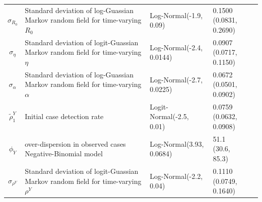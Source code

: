 \begin{table}
\begin{tabularx}{\columnwidth}{cXllc}
$\sigma_{R_0}$ & Standard deviation of log-Guassian Markov random field for time-varying $R_0$ & Log-Normal(-1.9, 0.09) & \makecell{0.1500 \\ (0.0831, 0.2690)} & \\
$\sigma_\eta$ & Standard deviation of logit-Guassian Markov random field for time-varying $\eta$ & Log-Normal(-2.4, 0.0144) & \makecell{0.0907 \\ (0.0717, 0.1150)} & \\
$\sigma_\alpha$ & Standard deviation of log-Guassian Markov random field for time-varying $\alpha$ & Log-Normal(-2.7, 0.0225) & \makecell{0.0672 \\ (0.0501, 0.0902)} & \\
\hline
$\tilde{\rho}^Y_1$ & Initial case detection rate & Logit-Normal(-2.5, 0.01) & \makecell{0.0759 \\ (0.0632, 0.0908)} & \cite{Bruckner2021} \\
$\phi_Y$ & over-dispersion in observed cases Negative-Binomial model & Log-Normal(3.93, 0.0684) & \makecell{51.1 \\ (30.6, 85.3)} & \\
$\sigma_{\rho^Y}$ & Standard deviation of logit-Guassian Markov random field for time-varying $\rho^Y$ & Log-Normal(-2.2, 0.04) & \makecell{0.1110 \\ (0.0749, 0.1640)} &
	\end{tabularx}
\end{table}

